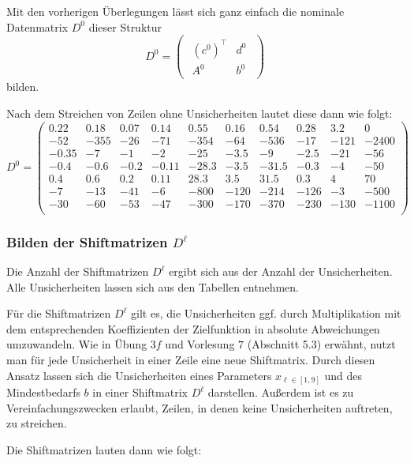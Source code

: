 \documentclass[a4paper,12pt]{article}
\begin{document}
Mit den vorherigen \"Uberlegungen l\"asst sich ganz einfach die nominale Datenmatrix $D^0$ dieser Struktur
\[
D^0 = \begin{pmatrix}\begin{array}{c|c}
(c^0)^\top & d^0 \\ \hline
A^0 & b^0
\end{array}\end{pmatrix}
\]
bilden.

Nach dem Streichen von Zeilen ohne Unsicherheiten lautet diese dann wie folgt:
\[
D^0 = \begin{pmatrix}
0.22 & 0.18 & 0.07 & 0.14 & 0.55 & 0.16 & 0.54 & 0.28 & 3.2 & 0 \\ %
-52 & -355 & -26 & -71 & -354 & -64 & -536 & -17 & -121 & -2400 \\ %
-0.35 & -7 & -1 & -2 & -25 & -3.5 & -9 & -2.5 & -21 & -56 \\ %
-0.4 & -0.6 & -0.2 & -0.11 & -28.3 & -3.5 & -31.5 & -0.3 & -4 & -50 \\ %
0.4 & 0.6 & 0.2 & 0.11 & 28.3 & 3.5 & 31.5 & 0.3 & 4 & 70 \\ %
-7 & -13 & -41 & -6 & -800 & -120 & -214 & -126 & -3 & -500 \\ %
-30 & -60 & -53 & -47 & -300 & -170 & -370 & -230 & -130 & -1100 \\ %
\end{pmatrix}
\]

\subsubsection*{Bilden der Shiftmatrizen $D^\ell$}
Die Anzahl der Shiftmatrizen $D^\ell$ ergibt sich aus der Anzahl der Unsicherheiten. Alle Unsicherheiten lassen sich aus den Tabellen entnehmen.

F\"ur die Shiftmatrizen $D^\ell$ gilt es, die Unsicherheiten ggf. durch Multiplikation mit dem entsprechenden Koeffizienten der Zielfunktion in absolute Abweichungen umzuwandeln.
Wie in \"{U}bung $3f$ und Vorlesung $7$ (Abschnitt 5.3) erw\"{a}hnt, nutzt man f\"{u}r jede Unsicherheit in einer Zeile eine neue Shiftmatrix.
Durch diesen Ansatz lassen sich die Unsicherheiten eines Parameters $x_{\ell \in [1,9]}$ und des Mindestbedarfs $b$ in einer Shiftmatrix $D^\ell$ darstellen. Au\ss erdem ist es zu Vereinfachungszwecken erlaubt, Zeilen, in denen keine Unsicherheiten auftreten, zu streichen.

Die Shiftmatrizen lauten dann wie folgt:
\end{document}

